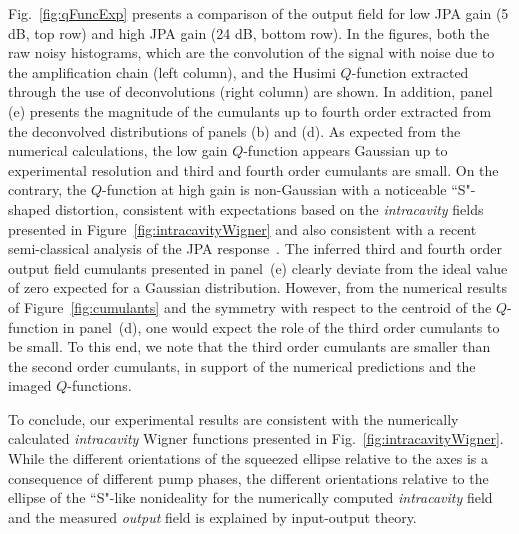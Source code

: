 \documentclass[pra,twocolumn,superscriptaddress]{revtex4-1}
\begin{document}
Fig.~\ref{fig:qFuncExp} presents a comparison of the output field for low JPA gain (5 dB, top row) and high JPA gain (24 dB, bottom row).
In the figures, both the raw noisy histograms, which are the convolution of the signal with noise due to the amplification chain (left column), and the Husimi $Q$-function extracted through the use of deconvolutions (right column) are shown. 
In addition, panel (e) presents the magnitude of the cumulants up to fourth order extracted from the deconvolved distributions of panels (b) and (d).
As expected from the numerical calculations, the low gain $Q$-function appears Gaussian up to experimental resolution and third and fourth order cumulants are small.
% 
On the contrary, the $Q$-function at high gain is non-Gaussian with a noticeable ``S"-shaped distortion, consistent with expectations based on the \emph{intracavity} fields presented in Figure~\ref{fig:intracavityWigner} and also consistent with a recent semi-classical analysis of the JPA response~\cite{Bienfait:2016yq}. The inferred third and fourth order output field cumulants presented in panel~(e) clearly deviate from the ideal value of zero expected for a Gaussian distribution. However, from the numerical results of Figure~\ref{fig:cumulants} and the symmetry with respect to the centroid of the $Q$-function in panel~(d), one would expect the role of the third order cumulants to be small. To this end, we note that the third order cumulants are smaller than the second order cumulants, in support of the numerical predictions and the imaged $Q$-functions.


To conclude, our experimental results are consistent with the numerically calculated \emph{intracavity} Wigner functions presented in Fig.~\ref{fig:intracavityWigner}. 
While the different orientations of the squeezed ellipse relative to the axes is a consequence of different pump phases, the different orientations relative to the ellipse of the ``S"-like nonideality for the numerically computed \emph{intracavity} field and the measured \emph{output} field is explained by input-output theory.





\end{document}
